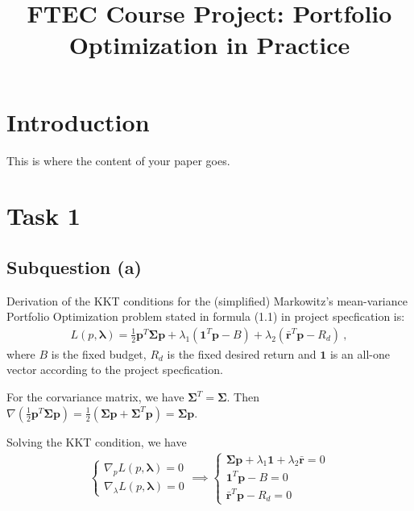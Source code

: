 \documentclass[12pt]{ftec2101}
\title{FTEC Course Project: Portfolio Optimization in Practice}
\newcommand{\matr}[1]{\mathbf{#1}}
\newcommand{\vect}[1]{\mathbf{#1}}
\begin{document}
\maketitle


\section{Introduction}

This is where the content of your paper goes.

\section{Task 1}
\subsection{Subquestion (a)}
Derivation of the KKT conditions for the (simplified) Markowitz's mean-variance Portfolio Optimization problem stated in formula (1.1) in project specfication is:
\begin{align}
    L(p,\vect{\lambda}) = \frac{1}{2}\vect{p}^T\matr{\Sigma} \vect{p} + \lambda_{1} (\vect{1}^T \vect{p}-B) +\lambda_{2} (\bar{\vect{r}}^T \vect{p}-R_{d})\ ,
\end{align}
where $B$ is the fixed budget, $R_d$ is the fixed desired return and $\vect{1}$ is an all-one vector according to the project specfication.

\noindent
For the corvariance matrix, we have $\matr{\Sigma}^T = \matr{\Sigma}$. Then $\nabla \left(\frac{1}{2}\vect{p}^T \matr{\Sigma} \vect{p}\right) = \frac{1}{2}(\matr{\Sigma}\vect{p}+\matr{\Sigma}^T \vect{p}) = \matr{\Sigma}\vect{p}$. 

\noindent
Solving the KKT condition, we have
\begin{align}
    \begin{cases}
        \nabla_{p} L(p,\vect{\lambda}) = 0 \\
        \nabla_{\lambda} L(p,\vect{\lambda}) = 0
    \end{cases}
    \implies
    \begin{cases}
        \matr{\Sigma}\vect{p}+\lambda_1 \vect{1} + \lambda_2 \bar{\vect{r}} = 0 \\
        \vect{1}^T \vect{p} - B = 0 \\
        \bar{\vect{r}}^T \vect{p} - R_d = 0
    \end{cases}
    \label{KKT:1}
\end{align}
\end{document}
